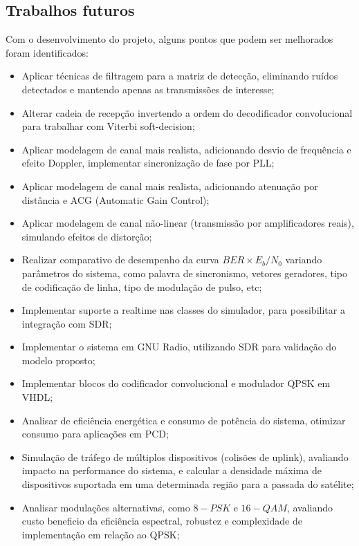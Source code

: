 \subsection{Trabalhos futuros}

Com o desenvolvimento do projeto, alguns pontos que podem ser melhorados foram identificados: 

\begin{itemize}
    \item Aplicar técnicas de filtragem para a matriz de detecção, eliminando ruídos detectados e mantendo apenas as transmissões de interesse; 
    \item Alterar cadeia de recepção invertendo a ordem do decodificador convolucional para trabalhar com Viterbi soft-decision;
    \item Aplicar modelagem de canal mais realista, adicionando desvio de frequência e efeito Doppler, implementar sincronização de fase por PLL;
    \item Aplicar modelagem de canal mais realista, adicionando atenuação por distância e ACG (Automatic Gain Control);
    \item Aplicar modelagem de canal não-linear (transmissão por amplificadores reais), simulando efeitos de distorção;
    \item Realizar comparativo de desempenho da curva $BER \times E_b/N_0$ variando parâmetros do sistema, como palavra de sincronismo, vetores geradores, tipo de codificação de linha, tipo de modulação de pulso, etc;
    \item Implementar suporte a realtime nas classes do simulador, para possibilitar a integração com \gls{SDR};
    \item Implementar o sistema em GNU Radio, utilizando \gls{SDR} para validação do modelo proposto;
    \item Implementar blocos do codificador convolucional e modulador \gls{QPSK} em VHDL;
    \item Analisar de eficiência energética e consumo de potência do sistema, otimizar consumo para aplicações em \gls{PCD};
    \item Simulação de tráfego de múltiplos dispositivos (colisões de uplink), avaliando impacto na performance do sistema, e calcular a densidade máxima de dispositivos suportada em uma determinada região para a passada do satélite;
    \item Analisar modulações alternativas, como $8-PSK$ e $16-QAM$, avaliando custo beneficio da eficiência espectral, robustez e complexidade de implementação em relação ao \gls{QPSK};
\end{itemize}
